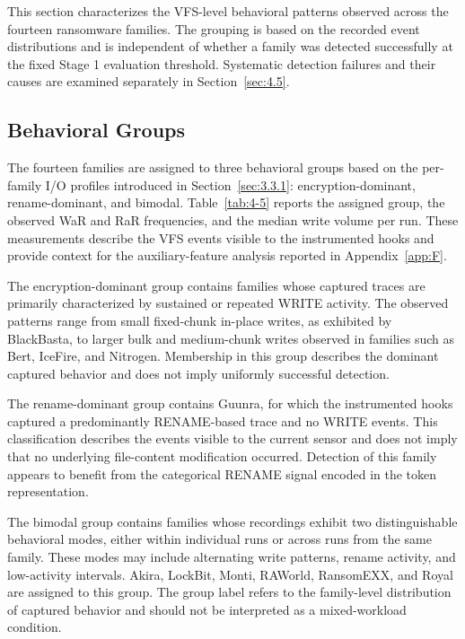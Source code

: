 This section characterizes the VFS-level behavioral patterns observed across the fourteen ransomware families. The grouping is based on the recorded event distributions and is independent of whether a family was detected successfully at the fixed Stage 1 evaluation threshold. Systematic detection failures and their causes are examined separately in Section~\ref{sec:4.5}.

\subsection{Behavioral Groups}\label{sec:4.4.1}

The fourteen families are assigned to three behavioral groups based on the per-family I/\allowbreak{}O profiles introduced in Section~\ref{sec:3.3.1}: encryption-dominant, rename-dominant, and bimodal. Table~\ref{tab:4-5} reports the assigned group, the observed WaR and RaR frequencies, and the median write volume per run. These measurements describe the VFS events visible to the instrumented hooks and provide context for the auxiliary-feature analysis reported in Appendix~\ref{app:F}.

The encryption-dominant group contains families whose captured traces are primarily characterized by sustained or repeated WRITE activity. The observed patterns range from small fixed-chunk in-place writes, as exhibited by BlackBasta, to larger bulk and medium-chunk writes observed in families such as Bert, IceFire, and Nitrogen. Membership in this group describes the dominant captured behavior and does not imply uniformly successful detection.

The rename-dominant group contains Guunra, for which the instrumented hooks captured a predominantly RENAME-based trace and no WRITE events. This classification describes the events visible to the current sensor and does not imply that no underlying file-content modification occurred. Detection of this family appears to benefit from the categorical RENAME signal encoded in the token representation.

The bimodal group contains families whose recordings exhibit two distinguishable behavioral modes, either within individual runs or across runs from the same family. These modes may include alternating write patterns, rename activity, and low-activity intervals. Akira, LockBit, Monti, RAWorld, RansomEXX, and Royal are assigned to this group. The group label refers to the family-level distribution of captured behavior and should not be interpreted as a mixed-workload condition.

